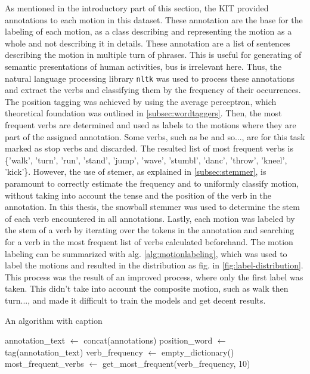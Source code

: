 As mentioned in the introductory part of this section, the KIT provided annotations to each motion in this dataset. These annotation are the base for the labeling of each motion, as a class describing and representing the motion as a whole and not describing it in details. These annotation are a list of sentences describing the motion in multiple turn of phrases. This is useful for generating of semantic presentations of human activities, bus is irrelevant here. Thus, the natural language processing library \texttt{nltk} was used to process these annotations and extract the verbs and classifying them by the frequency of their occurrences. The position tagging was achieved by using the average perceptron, which theoretical foundation was outlined in \ref{subsec:wordtaggers}. Then, the most frequent verbs are determined and used as labels to the motions where they are part of the assigned annotation. Some verbs, such as be and so..., are for this task marked as stop verbs and discarded. The resulted list of most frequent verbs is \{'walk', 'turn', 'run', 'stand', 'jump', 'wave', 'stumbl', 'danc', 'throw', 'kneel', 'kick'\}. However, the use of stemer, as explained in \ref{subsec:stemmer}, is paramount to correctly estimate the frequency and to uniformly classify motion, without taking into account the tense and the position of the verb in the annotation. In this thesis, the snowball stemmer was used to determine the stem of each verb encountered in all annotations. Lastly, each motion was labeled by the stem of a verb by iterating over the tokens in the annotation and searching for a verb in the most frequent list of verbs calculated beforehand. The motion labeling can be summarized with alg. \ref{alg:motionlabeling}, which was used to label the motions and resulted in the distribution as fig. in \ref{fig:label-distribution}. This process was the result of an improved process, where only the first label was taken. This didn't take into account the composite motion, such as walk then turn..., and made it difficult to train the models and get decent results.\newline
\begin{algorithm}[H]
\caption{An algorithm with caption}\label{alg:motionlabeling}
annotation\_text $\gets$ concat(annotations)\;
position\_word $\gets$ tag(annotation\_text)\; 
verb\_frequency $\gets$ empty\_dictionary()\;
most\_frequent\_verbs $\gets$ get\_most\_frequent(verb\_frequency, 10)\;
\end{algorithm}
